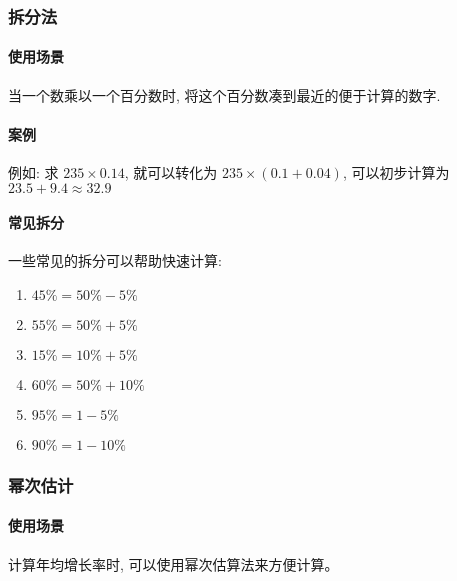 \subsubsection{拆分法}

\paragraph{使用场景} 当一个数乘以一个百分数时, 将这个百分数凑到最近的便于计算的数字.

\paragraph{案例} 例如: 求 $235 \times 0.14$, 就可以转化为 $235 \times (0.1 + 0.04)$, 可以初步计算为$23.5 + 9.4 \approx 32.9$

\paragraph{常见拆分} 一些常见的拆分可以帮助快速计算:

\begin{multicols}{2}
	\begin{enumerate}
		\item $45\% = 50\% - 5\%$
		\item $55\% = 50\% + 5\%$
		\item $15\% = 10\% + 5\%$
		\item $60\% = 50\% + 10\%$
		\item $95\% = 1 - 5\%$
		\item $90\% = 1 - 10\%$
	\end{enumerate}
\end{multicols}

\subsubsection{幂次估计}

\paragraph{使用场景} 计算年均增长率时, 可以使用幂次估算法来方便计算。

